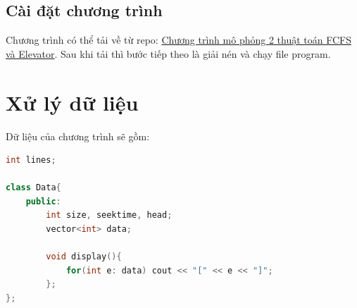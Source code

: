 \documentclass{report}
\begin{document}
        \subsection{Cài đặt chương trình}
        Chương trình có thể tải về từ repo: \href{https://github.com/kat1002/osg202_presentation.git}{Chương trình mô phỏng 2 thuật toán FCFS và Elevator}.
        Sau khi tải thì bước tiếp theo là giải nén và chạy file program.
            
    \section{Xử lý dữ liệu}
        Dữ liệu của chương trình sẽ gồm:

        \begin{lstlisting}[language=C++, caption=Data in program]
int lines;

class Data{
    public: 
        int size, seektime, head;
        vector<int> data;
        
        void display(){
            for(int e: data) cout << "[" << e << "]"; 
        };
};
        \end{lstlisting}
\end{document}

